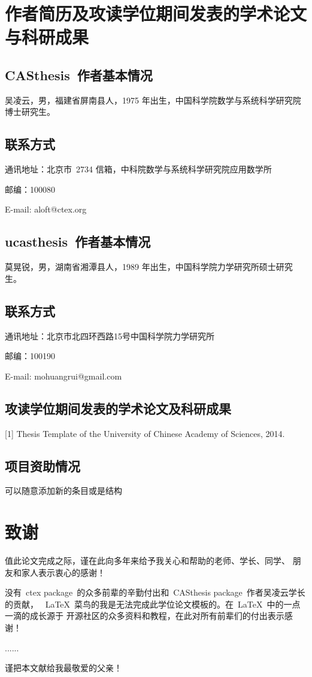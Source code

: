 \chapter{作者简历及攻读学位期间发表的学术论文与科研成果}

\section*{CASthesis~作者基本情况}

吴凌云，男，福建省屏南县人，1975 年出生，中国科学院数学与系统科学研究院博士研究生。

\section*{联系方式}

通讯地址：北京市~2734 信箱，中科院数学与系统科学研究院应用数学所

邮编：100080

E-mail: aloft@ctex.org

\section*{ucasthesis~作者基本情况}

莫晃锐，男，湖南省湘潭县人，1989 年出生，中国科学院力学研究所硕士研究生。

\section*{联系方式}

通讯地址：北京市北四环西路15号中国科学院力学研究所

邮编：100190

E-mail: mohuangrui@gmail.com

\section*{攻读学位期间发表的学术论文及科研成果}

[1] Thesis Template of the University of Chinese Academy of Sciences, 2014.

\section*{项目资助情况}

可以随意添加新的条目或是结构

\chapter{致\quad 谢}

值此论文完成之际，谨在此向多年来给予我关心和帮助的老师、学长、同学、
朋友和家人表示衷心的感谢！

没有~ctex package~的众多前辈的辛勤付出和~CASthesis package~作者吴凌云学长的贡献，
~\LaTeX{}~菜鸟的我是无法完成此学位论文模板的。在~\LaTeX{}~中的一点一滴的成长源于
开源社区的众多资料和教程，在此对所有前辈们的付出表示感谢！

......

谨把本文献给我最敬爱的父亲！
